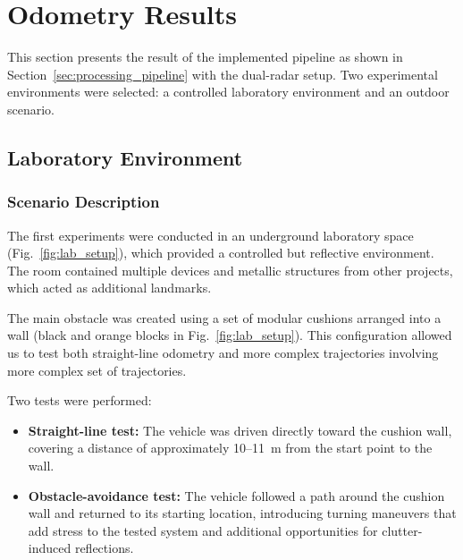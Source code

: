 \section{Odometry Results}
\label{sec:odometry_results}

This section presents the result of the implemented pipeline as shown in Section~\ref{sec:processing_pipeline} with the dual-radar setup.
Two experimental environments were selected: a controlled laboratory environment and an outdoor scenario. 

\subsection{Laboratory Environment}
\subsubsection{Scenario Description}

The first experiments were conducted in an underground laboratory space (Fig.~\ref{fig:lab_setup}), which provided a controlled but reflective environment.  
The room contained multiple devices and metallic structures from other projects, which acted as additional landmarks.  

The main obstacle was created using a set of modular cushions arranged into a wall (black and orange blocks in Fig.~\ref{fig:lab_setup}).  
This configuration allowed us to test both straight-line odometry and more complex trajectories involving more complex set of trajectories.  

Two tests were performed:
\begin{itemize}
    \item \textbf{Straight-line test:} The vehicle was driven directly toward the cushion wall, covering a distance of approximately 10--11~m from the start point to the wall.  
    \item \textbf{Obstacle-avoidance test:} The vehicle followed a path around the cushion wall and returned to its starting location, introducing turning maneuvers that add stress to the tested system and additional opportunities for clutter-induced reflections.  
\end{itemize}

